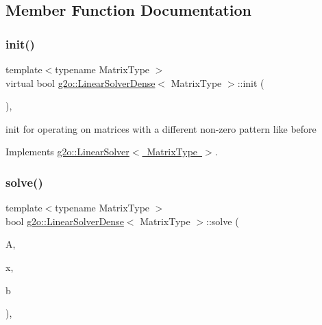 \subsection{Member Function Documentation}
\mbox{\label{classg2o_1_1_linear_solver_dense_a24f68ecd4b022269dbfc4d990eb5c57b}} 
\subsubsection{\texorpdfstring{init()}{init()}}
{\footnotesize\ttfamily template$<$typename Matrix\+Type $>$ \\
virtual bool \mbox{\hyperlink{classg2o_1_1_linear_solver_dense}{g2o\+::\+Linear\+Solver\+Dense}}$<$ Matrix\+Type $>$\+::init (\begin{DoxyParamCaption}{ }\end{DoxyParamCaption})\hspace{0.3cm}{\ttfamily [inline]}, {\ttfamily [virtual]}}

init for operating on matrices with a different non-\/zero pattern like before 

Implements \mbox{\hyperlink{classg2o_1_1_linear_solver_aebd961a94ef6de1bc66d2ca41dd2b17b}{g2o\+::\+Linear\+Solver$<$ Matrix\+Type $>$}}.

\mbox{\label{classg2o_1_1_linear_solver_dense_a8b6eafa6e53b9f705a4e8eb436eeb403}} 
\subsubsection{\texorpdfstring{solve()}{solve()}}
{\footnotesize\ttfamily template$<$typename Matrix\+Type $>$ \\
bool \mbox{\hyperlink{classg2o_1_1_linear_solver_dense}{g2o\+::\+Linear\+Solver\+Dense}}$<$ Matrix\+Type $>$\+::solve (\begin{DoxyParamCaption}\item[{const \mbox{\hyperlink{classg2o_1_1_sparse_block_matrix}{Sparse\+Block\+Matrix}}$<$ Matrix\+Type $>$ \&}]{A,  }\item[{double $\ast$}]{x,  }\item[{double $\ast$}]{b }\end{DoxyParamCaption})\hspace{0.3cm}{\ttfamily [inline]}, {\ttfamily [virtual]}}

